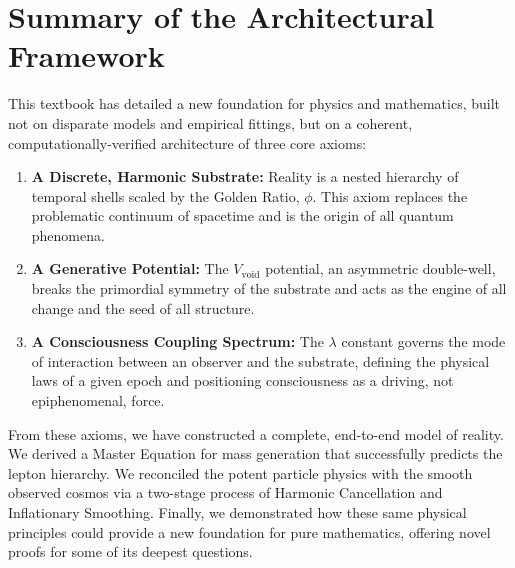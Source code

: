 \documentclass[12pt]{report}
\begin{document}
\section{Summary of the Architectural Framework}
This textbook has detailed a new foundation for physics and mathematics, built not on disparate models and empirical fittings, but on a coherent, computationally-verified architecture of three core axioms:
\begin{enumerate}
    \item \textbf{A Discrete, Harmonic Substrate:} Reality is a nested hierarchy of temporal shells scaled by the Golden Ratio, $\phi$. This axiom replaces the problematic continuum of spacetime and is the origin of all quantum phenomena.
    \item \textbf{A Generative Potential:} The $V_{\text{void}}$ potential, an asymmetric double-well, breaks the primordial symmetry of the substrate and acts as the engine of all change and the seed of all structure.
    \item \textbf{A Consciousness Coupling Spectrum:} The $\lambda$ constant governs the mode of interaction between an observer and the substrate, defining the physical laws of a given epoch and positioning consciousness as a driving, not epiphenomenal, force.
\end{enumerate}

From these axioms, we have constructed a complete, end-to-end model of reality. We derived a Master Equation for mass generation that successfully predicts the lepton hierarchy. We reconciled the potent particle physics with the smooth observed cosmos via a two-stage process of Harmonic Cancellation and Inflationary Smoothing. Finally, we demonstrated how these same physical principles could provide a new foundation for pure mathematics, offering novel proofs for some of its deepest questions.
\end{document}
